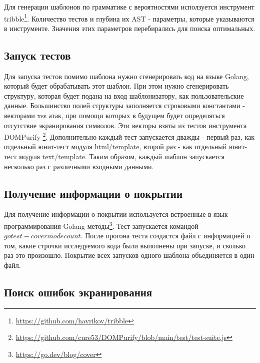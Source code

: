 \documentclass[a4paper]{article}
\begin{document}
Для генерации шаблонов по грамматике с вероятностями исползуется инструмент tribble\footnote{\href{https://github.com/havrikov/tribble}{https://github.com/havrikov/tribble}}. Количество тестов и глубина их AST - параметры, которые указываются в инструменте. Значения этих параметров перебирались для поиска оптимальных.

\subsection{Запуск тестов}

Для запуска тестов помимо шаблона нужно сгенерировать код на языке Golang, который будет обрабатывать этот шаблон. При этом нужно сгенерировать структуру, которая будет подана на вход шаблонизатору, как пользовательские данные. Большинство полей структуры заполняется строковыми константами - векторами xss атак, при помощи которых в будущем будет определяться отсутствие экранирования символов. Эти векторы взяты из тестов инструмента DOMPurify \footnote{\href{https://github.com/cure53/DOMPurify/blob/main/test/test-suite.js}{https://github.com/cure53/DOMPurify/blob/main/test/test-suite.js}}. Дополнительно каждый тест запускается дважды - первый раз, как отдельный юнит-тест модуля html/template, второй раз - как отдельный юнит-тест модуля text/template. Таким образом, каждый шаблон запускается несколько раз с различными входными данными.

\subsection{Получение информации о покрытии}

Для получение информации о покрытии используется встроенные в язык программирования Golang методы\footnote{\href{https://go.dev/blog/cover}{https://go.dev/blog/cover}}. Тест запускается командой $go test -covermode count$. После прогона теста создастся файл с информацией о том, какие строчки исследуемого кода были выполнены при запуске, и сколько раз это произошло. Покрытие всех запусков одного шаблона объединяется в один файл. 

\subsection{Поиск ошибок экранирования}
\end{document}

